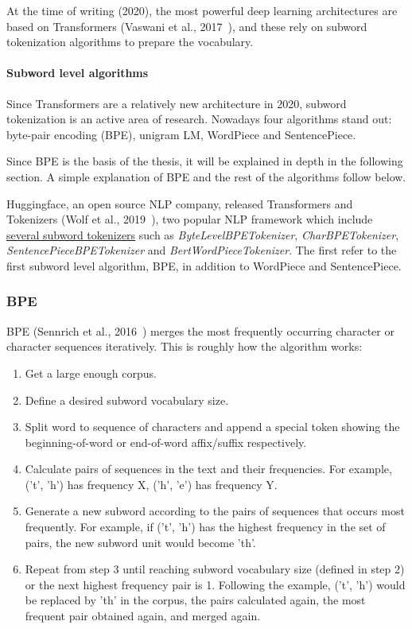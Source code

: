 At the time of writing (2020), the most powerful deep learning architectures are based on Transformers (Vaswani et al., 2017~\cite{vaswani2017attention}), and these rely on subword tokenization algorithms to prepare the vocabulary.

\paragraph{Subword level algorithms}

Since Transformers are a relatively new architecture in 2020, subword tokenization is an active area of research. Nowadays four algorithms stand out: byte-pair encoding (BPE), unigram LM, WordPiece and SentencePiece.

Since BPE is the basis of the thesis, it will be explained in depth in the following section. A simple explanation of BPE and the rest of the algorithms follow below.

Huggingface, an open source NLP company, released Transformers and Tokenizers (Wolf et al., 2019~\cite{wolf2019huggingfaces}), two popular NLP framework which include \href{https://github.com/huggingface/tokenizers/tree/74d812d40180032d2dbb6ca59e2e10f0257ef46b/bindings/python/tokenizers/implementations}{several subword tokenizers} such as \emph{ByteLevelBPETokenizer}, \emph{CharBPETokenizer}, \emph{SentencePieceBPETokenizer} and \emph{BertWordPieceTokenizer}. The first refer to the first subword level algorithm, BPE, in addition to WordPiece and SentencePiece.

\subsubsection{BPE}\label{subsubsec:bpe}

BPE (Sennrich et al., 2016~\cite{sennrich2015neural}) merges the most frequently occurring character or character sequences iteratively. This is roughly how the algorithm works:

\begin{enumerate}
    \item Get a large enough corpus.
    \item Define a desired subword vocabulary size.
    \item Split word to sequence of characters and append a special token showing the beginning-of-word or end-of-word affix/suffix respectively.
    \item Calculate pairs of sequences in the text and their frequencies. For example, ('t', 'h') has frequency X, ('h', 'e') has frequency Y.
    \item Generate a new subword according to the pairs of sequences that occurs most frequently. For example, if ('t', 'h') has the highest frequency in the set of pairs, the new subword unit would become 'th'.
    \item Repeat from step 3 until reaching subword vocabulary size (defined in step 2) or the next highest frequency pair is 1. Following the example, ('t', 'h') would be replaced by 'th' in the corpus, the pairs calculated again, the most frequent pair obtained again, and merged again.
\end{enumerate}

